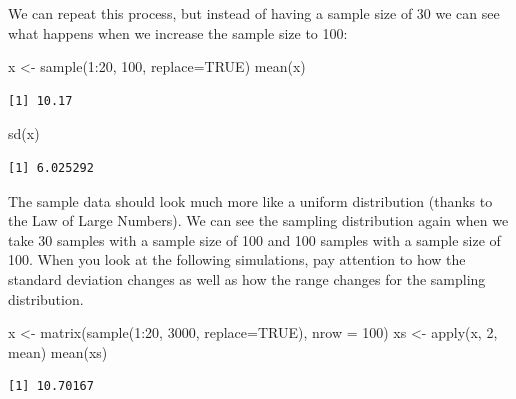 \documentclass[
  letterpaper,
  DIV=11,
  numbers=noendperiod]{scrreprt}
\newenvironment{Shaded}{\begin{snugshade}}{\end{snugshade}}
\newcommand{\AttributeTok}[1]{\textcolor[rgb]{0.40,0.45,0.13}{#1}}
\newcommand{\ConstantTok}[1]{\textcolor[rgb]{0.56,0.35,0.01}{#1}}
\newcommand{\DecValTok}[1]{\textcolor[rgb]{0.68,0.00,0.00}{#1}}
\newcommand{\FunctionTok}[1]{\textcolor[rgb]{0.28,0.35,0.67}{#1}}
\newcommand{\NormalTok}[1]{\textcolor[rgb]{0.00,0.23,0.31}{#1}}
\newcommand{\OtherTok}[1]{\textcolor[rgb]{0.00,0.23,0.31}{#1}}
\newcommand{\SpecialCharTok}[1]{\textcolor[rgb]{0.37,0.37,0.37}{#1}}
\begin{document}
We can repeat this process, but instead of having a sample size of 30 we
can see what happens when we increase the sample size to 100:

\begin{Shaded}
\begin{Highlighting}[]
\NormalTok{x }\OtherTok{\textless{}{-}} \FunctionTok{sample}\NormalTok{(}\DecValTok{1}\SpecialCharTok{:}\DecValTok{20}\NormalTok{, }\DecValTok{100}\NormalTok{, }\AttributeTok{replace=}\ConstantTok{TRUE}\NormalTok{)}
\FunctionTok{mean}\NormalTok{(x)}
\end{Highlighting}
\end{Shaded}

\begin{verbatim}
[1] 10.17
\end{verbatim}

\begin{Shaded}
\begin{Highlighting}[]
\FunctionTok{sd}\NormalTok{(x)}
\end{Highlighting}
\end{Shaded}

\begin{verbatim}
[1] 6.025292
\end{verbatim}

The sample data should look much more like a uniform distribution
(thanks to the Law of Large Numbers). We can see the sampling
distribution again when we take 30 samples with a sample size of 100 and
100 samples with a sample size of 100. When you look at the following
simulations, pay attention to how the standard deviation changes as well
as how the range changes for the sampling distribution.

\begin{Shaded}
\begin{Highlighting}[]
\NormalTok{x }\OtherTok{\textless{}{-}} \FunctionTok{matrix}\NormalTok{(}\FunctionTok{sample}\NormalTok{(}\DecValTok{1}\SpecialCharTok{:}\DecValTok{20}\NormalTok{, }\DecValTok{3000}\NormalTok{, }\AttributeTok{replace=}\ConstantTok{TRUE}\NormalTok{), }\AttributeTok{nrow =} \DecValTok{100}\NormalTok{)}
\NormalTok{xs }\OtherTok{\textless{}{-}} \FunctionTok{apply}\NormalTok{(x, }\DecValTok{2}\NormalTok{, mean)}
\FunctionTok{mean}\NormalTok{(xs)}
\end{Highlighting}
\end{Shaded}

\begin{verbatim}
[1] 10.70167
\end{verbatim}
\end{document}
